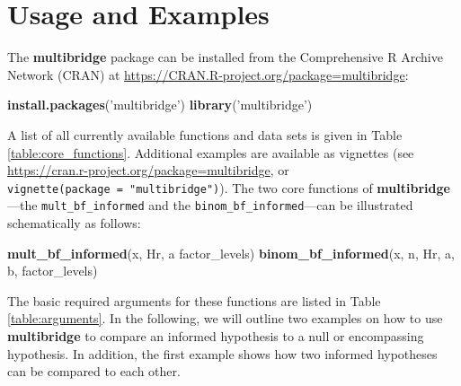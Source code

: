 \documentclass[
  english,
  man,floatsintext]{apa6}
\newenvironment{Shaded}{\begin{snugshade}}{\end{snugshade}}
\newcommand{\KeywordTok}[1]{\textcolor[rgb]{0.13,0.29,0.53}{\textbf{#1}}}
\newcommand{\NormalTok}[1]{#1}
\newcommand{\StringTok}[1]{\textcolor[rgb]{0.31,0.60,0.02}{#1}}
\begin{document}
\hypertarget{usage-and-examples}{%
\section{Usage and Examples}\label{usage-and-examples}}

\noindent The \textbf{multibridge} package can be installed from the Comprehensive R Archive Network (CRAN) at
\url{https://CRAN.R-project.org/package=multibridge}:

\begin{Shaded}
\begin{Highlighting}[]
\KeywordTok{install.packages}\NormalTok{(}\StringTok{'multibridge'}\NormalTok{)}
\KeywordTok{library}\NormalTok{(}\StringTok{'multibridge'}\NormalTok{)}
\end{Highlighting}
\end{Shaded}

A list of all currently available functions and data sets is given in Table \ref{table:core_functions}. Additional examples are available as vignettes (see \url{https://cran.r-project.org/package=multibridge}, or \texttt{vignette(package\ =\ "multibridge")}). The two core functions of \textbf{multibridge}---the \texttt{mult\_bf\_informed} and the \texttt{binom\_bf\_informed}---can be illustrated schematically as follows:

\begin{Shaded}
\begin{Highlighting}[]
\KeywordTok{mult_bf_informed}\NormalTok{(x, Hr, a factor_levels)}
\KeywordTok{binom_bf_informed}\NormalTok{(x, n, Hr, a, b, factor_levels)}
\end{Highlighting}
\end{Shaded}

The basic required arguments for these functions are listed in Table \ref{table:arguments}. In the following, we will outline two examples on how to use \textbf{multibridge} to compare an informed hypothesis to a null or encompassing hypothesis. In addition, the first example shows how two informed hypotheses can be compared to each other. \clearpage
\end{document}
